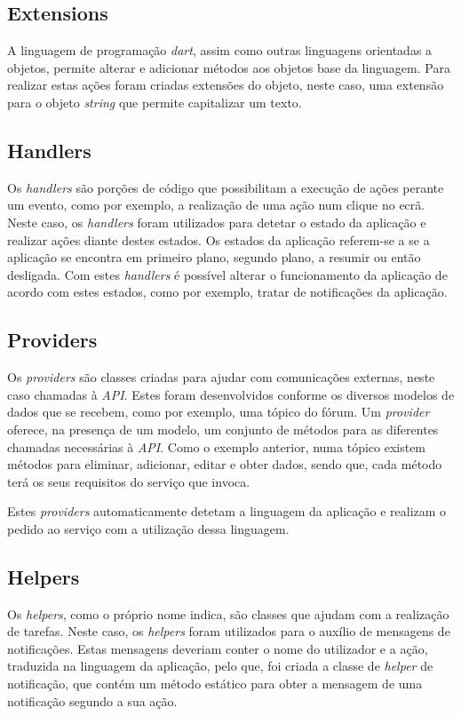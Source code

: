 \subsection{Extensions}
A linguagem de programação \textit{dart}, assim como outras linguagens orientadas a objetos, permite alterar e adicionar métodos aos objetos base da linguagem. Para realizar estas ações foram criadas extensões do objeto, neste caso, uma extensão para o objeto \textit{string} que permite capitalizar um texto.

\subsection{Handlers}
Os \textit{handlers} são porções de código que possibilitam a execução de ações perante um evento, como por exemplo, a realização de uma ação num clique no ecrã. Neste caso, os \textit{handlers} foram utilizados para detetar o estado da aplicação e realizar ações diante destes estados. Os estados da aplicação referem-se a se a aplicação se encontra em primeiro plano, segundo plano, a resumir ou então desligada. Com estes \textit{handlers} é possível alterar o funcionamento da aplicação de acordo com estes estados, como por exemplo, tratar de notificações da aplicação.

\subsection{Providers}
Os \textit{providers} são classes criadas para ajudar com comunicações externas, neste caso chamadas à \textit{API}. Estes foram desenvolvidos conforme os diversos modelos de dados que se recebem, como por exemplo, uma tópico do fórum. Um \textit{provider} oferece, na presença de um modelo, um conjunto de métodos para as diferentes chamadas necessárias à \textit{API}. Como o exemplo anterior, numa tópico existem métodos para eliminar, adicionar, editar e obter dados, sendo que, cada método terá os seus requisitos do serviço que invoca.

Estes \textit{providers} automaticamente detetam a linguagem da aplicação e realizam o pedido ao serviço com a utilização dessa linguagem.

\subsection{Helpers}
Os \textit{helpers}, como o próprio nome indica, são classes que ajudam com a realização de tarefas. Neste caso, os \textit{helpers} foram utilizados para o auxílio de mensagens de notificações. Estas mensagens deveriam conter o nome do utilizador e a ação, traduzida na linguagem da aplicação, pelo que, foi criada a classe de \textit{helper} de notificação, que contém um método estático para obter a mensagem de uma notificação segundo a sua ação.
